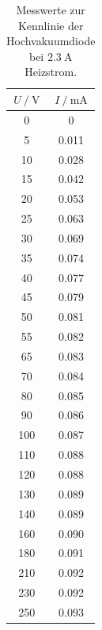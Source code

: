 \begin{table}
  \centering
  \caption{Messwerte zur Kennlinie der Hochvakuumdiode bei $\SI{2.3}{\ampere}$ Heizstrom.}
  \label{tab:a23tab}
  \begin{tabular}{S[table-format=3.0] S[table-format=1.3]}
    \toprule
    {$U \:/\: \si{\volt}$} & {$I \:/\: \si{\milli\ampere}$}\\
    	& 0 \\
    5 &	0.011 \\
    10 &	0.028 \\
    15 &	0.042 \\
    20 &	0.053 \\
    25 &	0.063 \\
    30 &	0.069 \\
    35 &	0.074 \\
    40 &	0.077 \\
    45 &	0.079 \\
    50 &	0.081 \\
    55 &	0.082 \\
    65 &	0.083 \\
    70 &	0.084 \\
    80 &	0.085 \\
    90 &	0.086 \\
    100 &	0.087 \\
    110 &	0.088 \\
    120 &	0.088 \\
    130 &	0.089 \\
    140 &	0.089 \\
    160 &	0.090 \\
    180 &	0.091 \\
    210 &	0.092 \\
    230 &	0.092 \\
    250 &	0.093 \\
   \end{tabular}
\end{table}

